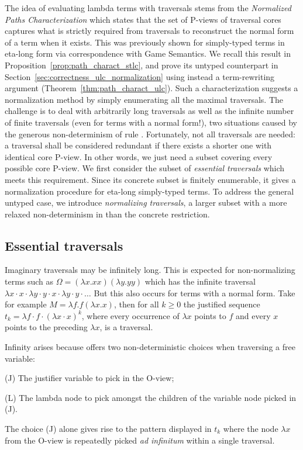 \documentclass{elsarticle}
\theoremstyle{plain}
\theoremstyle{definition}
\begin{document}
The idea of evaluating lambda terms with traversals stems from the \emph{Normalized Paths Characterization} which states that the set of P-views of traversal cores captures what is strictly required from traversals to reconstruct the normal form of a term when it exists.
This was previously shown for simply-typed terms in eta-long form via
correspondence with Game Semantics.
We recall this result
in Proposition~\ref{prop:path_charact_stlc},
and prove its untyped counterpart in
Section~\ref{sec:correctness_ulc_normalization} using instead a term-rewriting argument (Theorem~\ref{thm:path_charact_ulc}).
Such a characterization suggests a normalization method by simply enumerating all the maximal traversals.
The challenge is to deal with arbitrarily long traversals as well as the infinite number of finite traversals (even for terms with a normal form!),
two situations caused by the generous non-determinism of rule .
%
Fortunately, not all traversals are needed: a traversal shall be considered redundant if there exists a shorter one with identical core P-view.
In other words, we just need a subset covering
every possible core P-view.
%
We first consider the subset of \emph{essential traversals} which
meets this requirement.
Since its concrete subset is finitely enumerable, it gives
a normalization procedure for eta-long simply-typed terms.
To address the general untyped case,
we introduce \emph{normalizing traversals}, a larger subset
with a more relaxed non-determinism in  than the concrete restriction.

\subsection{Essential traversals}

Imaginary traversals may be infinitely long.
This is expected for non-normalizing terms such as $\Omega = (\lambda x. x x)(\lambda y. y y)$ which has the infinite traversal $\lambda x \cdot x \cdot \lambda y \cdot y \cdot x \cdot \lambda y \cdot y \cdot \ldots$ But this also occurs for terms with a normal form. Take for example $M = \lambda f . f (\lambda x. x)$, then for all $k\geq0$ the justified sequence $t_k = \lambda f \cdot f \cdot (\lambda x \cdot  x)^k$, where every occurrence of $\lambda x$ points to $f$ and every $x$ points to the preceding $\lambda x$, is a traversal.

Infinity arises because  offers two non-deterministic choices when traversing a free variable:
\begin{compactitem}
\item[(J)] The justifier variable to pick in the O-view;
\item[(L)] The lambda node to pick amongst the children of the variable node picked in (J).
\end{compactitem}
The choice (J) alone gives rise to the pattern displayed in $t_k$ where the node $\lambda x$ from the O-view is repeatedly picked {\it ad infinitum} within a single traversal.
\end{document}
